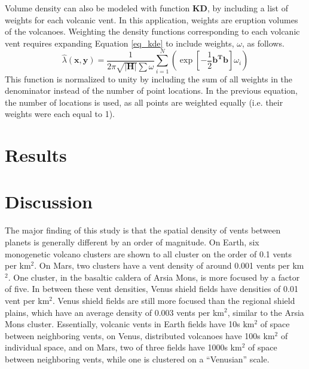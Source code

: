 \documentclass[12pt,letter]{article}
\begin{document}
Volume density can also be modeled with function \textbf{KD}, by including a list of weights for each volcanic vent. In this application, weights are eruption volumes of the volcanoes. Weighting the density functions corresponding to each volcanic vent requires expanding Equation \ref{eq_kde} to include weights, $\omega$, as follows.
\begin{equation}
\hat{\lambda}(\mathbf{x,y})=\frac{1}{2\pi\sqrt{|\mathbf{H}|}\sum{\omega}}\sum\limits_{i=1}^{N}\left(\exp\left[-\frac{1}{2}\mathbf{b^Tb}\right]\omega_i\right)
\label{eq_weigthedkde}
\end{equation}
This function is normalized to unity by including the sum of all weights in the denominator instead of the number of point locations. In the previous equation, the number of locations is used, as all points are weighted equally (i.e. their weights were each equal to 1).

\section{Results}

\section{Discussion}
The major finding of this study is that the spatial density of vents between planets is generally different by an order of magnitude. On Earth, six monogenetic volcano clusters are shown to all cluster on the order of 0.1 vents per km$^2$. On Mars, two clusters have a vent density of around 0.001 vents per km$^2$. One cluster, in the basaltic caldera of Arsia Mons, is more focused by a factor of five. In between these vent densities, Venus shield fields have densities of 0.01 vent per km$^2$. Venus shield fields are still more focused than the regional shield plains, which have an average density of 0.003 vents per km$^2$, similar to the Arsia Mons cluster. Essentially, volcanic vents in Earth fields have 10s km$^2$ of space between neighboring vents, on Venus, distributed volcanoes have 100s km$^2$ of individual space, and on Mars, two of three fields have 1000s  km$^2$ of space between neighboring vents, while one is clustered on a ``Venusian'' scale.
\end{document}
